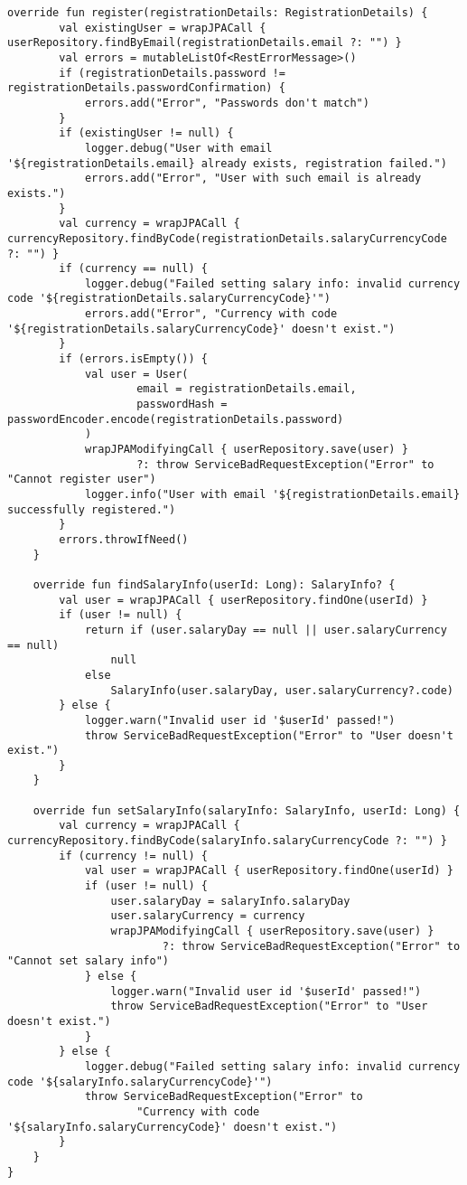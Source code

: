 \begin{lstlisting}[style = ktstyle]
    override fun register(registrationDetails: RegistrationDetails) {
        val existingUser = wrapJPACall { userRepository.findByEmail(registrationDetails.email ?: "") }
        val errors = mutableListOf<RestErrorMessage>()
        if (registrationDetails.password != registrationDetails.passwordConfirmation) {
            errors.add("Error", "Passwords don't match")
        }
        if (existingUser != null) {
            logger.debug("User with email '${registrationDetails.email} already exists, registration failed.")
            errors.add("Error", "User with such email is already exists.")
        }
        val currency = wrapJPACall { currencyRepository.findByCode(registrationDetails.salaryCurrencyCode ?: "") }
        if (currency == null) {
            logger.debug("Failed setting salary info: invalid currency code '${registrationDetails.salaryCurrencyCode}'")
            errors.add("Error", "Currency with code '${registrationDetails.salaryCurrencyCode}' doesn't exist.")
        }
        if (errors.isEmpty()) {
            val user = User(
                    email = registrationDetails.email,
                    passwordHash = passwordEncoder.encode(registrationDetails.password)
            )
            wrapJPAModifyingCall { userRepository.save(user) }
                    ?: throw ServiceBadRequestException("Error" to "Cannot register user")
            logger.info("User with email '${registrationDetails.email} successfully registered.")
        }
        errors.throwIfNeed()
    }

    override fun findSalaryInfo(userId: Long): SalaryInfo? {
        val user = wrapJPACall { userRepository.findOne(userId) }
        if (user != null) {
            return if (user.salaryDay == null || user.salaryCurrency == null)
                null
            else
                SalaryInfo(user.salaryDay, user.salaryCurrency?.code)
        } else {
            logger.warn("Invalid user id '$userId' passed!")
            throw ServiceBadRequestException("Error" to "User doesn't exist.")
        }
    }

    override fun setSalaryInfo(salaryInfo: SalaryInfo, userId: Long) {
        val currency = wrapJPACall { currencyRepository.findByCode(salaryInfo.salaryCurrencyCode ?: "") }
        if (currency != null) {
            val user = wrapJPACall { userRepository.findOne(userId) }
            if (user != null) {
                user.salaryDay = salaryInfo.salaryDay
                user.salaryCurrency = currency
                wrapJPAModifyingCall { userRepository.save(user) }
                        ?: throw ServiceBadRequestException("Error" to "Cannot set salary info")
            } else {
                logger.warn("Invalid user id '$userId' passed!")
                throw ServiceBadRequestException("Error" to "User doesn't exist.")
            }
        } else {
            logger.debug("Failed setting salary info: invalid currency code '${salaryInfo.salaryCurrencyCode}'")
            throw ServiceBadRequestException("Error" to
                    "Currency with code '${salaryInfo.salaryCurrencyCode}' doesn't exist.")
        }
    }
}
\end{lstlisting}